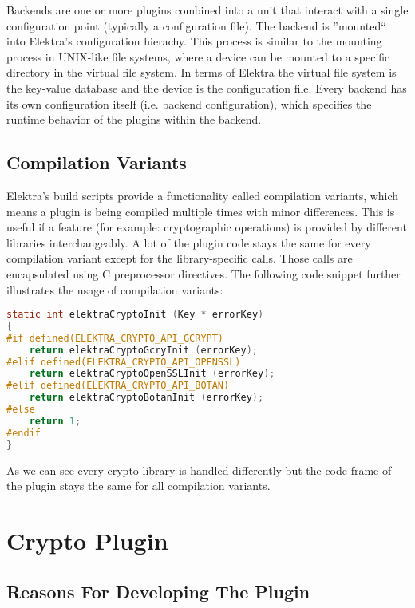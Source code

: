 Backends are one or more plugins combined into a unit that interact with a single configuration point (typically a configuration file).
The backend is ''mounted`` into Elektra's configuration hierachy.
This process is similar to the mounting process in UNIX-like file systems, where a device can be mounted to a specific directory in the virtual file system.
In terms of Elektra the virtual file system is the key-value database and the device is the configuration file.
Every backend has its own configuration itself (i.e. backend configuration), which specifies the runtime behavior of the plugins within the backend.

\subsection{Compilation Variants}

Elektra's build scripts provide a functionality called compilation variants, which means a plugin is being compiled multiple times with minor differences.
This is useful if a feature (for example: cryptographic operations) is provided by different libraries interchangeably.
A lot of the plugin code stays the same for every compilation variant except for the library-specific calls.
Those calls are encapsulated using C preprocessor directives.
The following code snippet further illustrates the usage of compilation variants:

\begin{lstlisting}[language=C,caption={Example usage of compilation variants in Elektra}]
static int elektraCryptoInit (Key * errorKey)
{
#if defined(ELEKTRA_CRYPTO_API_GCRYPT)
	return elektraCryptoGcryInit (errorKey);
#elif defined(ELEKTRA_CRYPTO_API_OPENSSL)
	return elektraCryptoOpenSSLInit (errorKey);
#elif defined(ELEKTRA_CRYPTO_API_BOTAN)
	return elektraCryptoBotanInit (errorKey);
#else
	return 1;
#endif
}
\end{lstlisting}

As we can see every crypto library is handled differently but the code frame of the plugin stays the same for all compilation variants.

\section{Crypto Plugin}\label{crypto-plugin}

\subsection{Reasons For Developing The Plugin}

